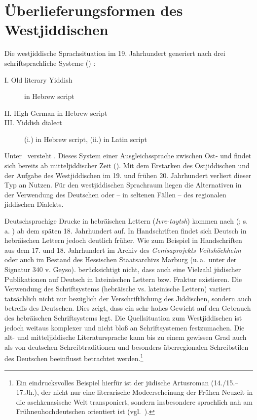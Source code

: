  
 
 
 \section{Überlieferungsformen des Westjiddischen}\label{Überlieferungsformen}
 \largerpage[-1]
Die westjiddische Sprachsituation im 19. Jahrhundert generiert nach \citeauthor{Lowenstein1979} drei schriftsprachliche Systeme  (\citealt[180]{Lowenstein1979}) :   

 \begin{description}
  \item [I. Old literary Yiddish] in Hebrew script
  \item [II. High German in Hebrew script]  %
  \item [III. Yiddish dialect] (i.) in Hebrew script, (ii.) in Latin script  
  \end{description}

\noindent Unter  \,%
versteht \cite[179]{Lowenstein1979} . Dieses System einer Ausgleichssprache zwischen Ost- und  findet sich bereits ab mitteljiddischer Zeit (\citealt[17]{Kerler1999}). Mit dem Erstarken des Ostjiddischen und der Aufgabe des Westjiddischen im 19. und frühen 20. Jahrhundert verliert dieser Typ an Nutzen. Für den westjiddischen Sprachraum liegen die Alternativen in der Verwendung des Deutschen oder – in seltenen Fällen – des regionalen jiddischen Dialekts.

Deutschsprachige Drucke in hebräischen Lettern (\textit{Ivre-taytsh}) kommen nach \citeauthor{Lowenstein1979} (\citeyear[179--180]{Lowenstein1979}; s.\,a. \citealt[113]{Beider2013}) ab dem späten 18. Jahrhundert auf. In Handschriften findet sich Deutsch in hebräischen Lettern jedoch deutlich früher. Wie zum Beispiel in Handschriften aus dem 17. und 18. Jahrhundert im Archiv des \textit{Genisaprojekts Veitshöchheim} oder auch im Bestand des Hessischen Staatsarchivs Marburg (u.\,a.\, unter der Signatur 340 v. Geyso). \citeauthor{Lowenstein1979} berücksichtigt nicht, dass auch eine Vielzahl jüdischer Publikationen auf Deutsch in lateinischen Lettern bzw. Fraktur existieren. Die Verwendung des Schriftsystems (hebräische vs. lateinische Lettern) variiert tatsächlich nicht nur bezüglich der Verschriftlichung des Jiddischen, sondern auch betreffs des Deutschen. Dies zeigt, dass \citeauthor{Lowenstein1979} ein sehr hohes Gewicht auf den Gebrauch des hebräischen Schriftsystems legt. Die Quellsituation zum Westjiddischen ist jedoch weitaus komplexer und nicht bloß an Schriftsystemen festzumachen. Die alt- und mitteljiddische Literatursprache kann bis zu einem gewissen Grad auch als von deutschen Schreibtraditionen und besonders überregionalen Schreibstilen des Deutschen beeinflusst betrachtet werden.\footnote{Ein eindrucksvolles Beispiel hierfür ist der jüdische Artusroman  (14./15.–17.Jh.), der nicht nur eine literarische Modeerscheinung der Frühen Neuzeit in die aschkenasische Welt transponiert, sondern insbesondere sprachlich nah am Frühneuhochdeutschen orientiert ist  (vgl.\, \citealt{Jaeger2000,Wolf1974}).}  

